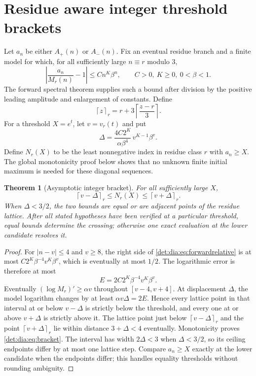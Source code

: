 \documentclass[11pt,letterpaper]{article}
\numberwithin{equation}{section}
\newtheorem{theorem}{Theorem}[section]
\theoremstyle{definition}\newtheorem{definition}[theorem]{Definition}
\theoremstyle{remark}\newtheorem{remark}[theorem]{Remark}
\newcommand{\ceilr}[2]{\left\lceil #1\right\rceil_{#2}}
\begin{document}
\section{Residue aware integer threshold brackets}\label{det:dia:sec:brackets}
Let $a_n$ be either $A_+(n)$ or $A_-(n)$. Fix an eventual residue branch
and a finite model for which, for all sufficiently large $n\equiv r$
modulo $3$,
\begin{equation}\label{det:dia:eq:forwardrelative}
 \left|\frac{a_n}{M_r(n)}-1\right|\leq C n^K\beta^n,
 \qquad C>0,\ K\geq0,\ 0<\beta<1.
\end{equation}
The forward spectral theorem supplies such a bound after division by
the positive leading amplitude and enlargement of constants. Define
\[
 \ceilr{z}{r}=r+3\left\lceil\frac{z-r}{3}\right\rceil.
\]
For a threshold $X=e^t$, let $v=v_r(t)$ and put
\begin{equation}\label{det:dia:eq:Delta}
 \Delta=\frac{4C2^K}{\alpha\beta^4}\,v^{K-1}\beta^v.
\end{equation}
Define $N_r(X)$ to be the least nonnegative index in residue class $r$
with $a_n\geq X$. The global monotonicity proof below shows that no
unknown finite initial maximum is needed for these diagonal sequences.

\begin{theorem}[Asymptotic integer bracket]\label{det:dia:thm:bracket}
For all sufficiently large $X$,
\begin{equation}\label{det:dia:eq:bracket}
 \ceilr{v-\Delta}{r}\leq N_r(X)\leq\ceilr{v+\Delta}{r}.
\end{equation}
When $\Delta<3/2$, the two bounds are equal or are adjacent points of
the residue lattice. After all stated hypotheses have been verified at
a particular threshold, equal bounds determine the crossing; otherwise
one exact evaluation at the lower candidate resolves it.
\end{theorem}
\begin{proof}
For $|n-v|\leq4$ and $v\geq8$, the right side of
\eqref{det:dia:eq:forwardrelative} is at most
$C2^K\beta^{-4}v^K\beta^v$, which is eventually at most $1/2$.
The logarithmic error is therefore at most
\begin{equation}\label{det:dia:eq:logerror}
 E=2C2^K\beta^{-4}v^K\beta^v.
\end{equation}
Eventually $(\log M_r)'\geq\alpha v$ throughout $[v-4,v+4]$.
At displacement $\Delta$, the model logarithm changes by at least
$\alpha v\Delta=2E$. Hence every lattice point in that interval at
or below $v-\Delta$ is strictly below the threshold, and every one
at or above $v+\Delta$ is strictly above it. The lattice point just
below $\ceilr{v-\Delta}{r}$ and the point
$\ceilr{v+\Delta}{r}$ lie within distance $3+\Delta<4$ eventually.
Monotonicity proves \eqref{det:dia:eq:bracket}. The interval has width
$2\Delta<3$ when $\Delta<3/2$, so its ceiling endpoints differ by at
most one lattice step. Compare $a_n\geq X$ exactly at the lower
candidate when the endpoints differ; this handles equality thresholds
without rounding ambiguity.
\end{proof}
\end{document}
